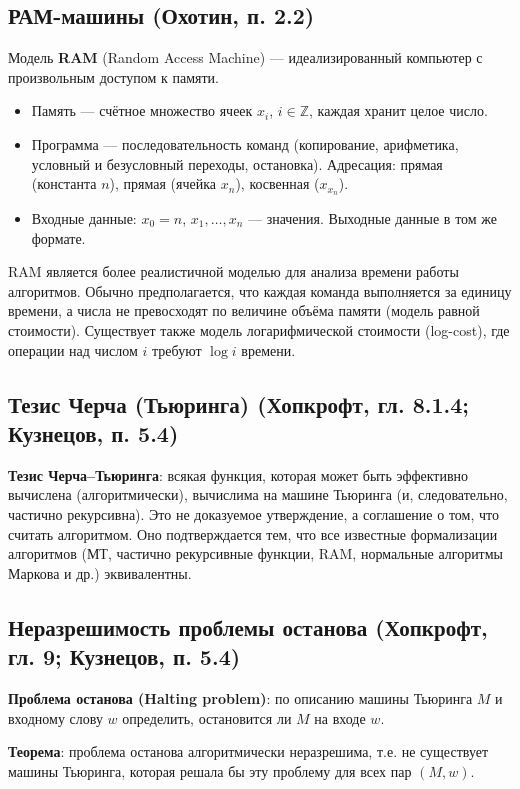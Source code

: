 \documentclass[a4paper,12pt]{article}
\begin{document}
\subsection{РАМ-машины (Охотин, п. 2.2)}
Модель \textbf{RAM} (Random Access Machine) --- идеализированный компьютер с произвольным доступом к памяти.
\begin{itemize}
    \item Память --- счётное множество ячеек \( x_i \), \( i\in\mathbb{Z} \), каждая хранит целое число.
    \item Программа --- последовательность команд (копирование, арифметика, условный и безусловный переходы, остановка). Адресация: прямая (константа \( n \)), прямая (ячейка \( x_n \)), косвенная (\( x_{x_n} \)).
    \item Входные данные: \( x_0 = n \), \( x_1,\dots,x_n \) --- значения. Выходные данные в том же формате.
\end{itemize}
RAM является более реалистичной моделью для анализа времени работы алгоритмов. Обычно предполагается, что каждая команда выполняется за единицу времени, а числа не превосходят по величине объёма памяти (модель равной стоимости). Существует также модель логарифмической стоимости (log-cost), где операции над числом \( i \) требуют \( \log i \) времени.

\subsection{Тезис Черча (Тьюринга) (Хопкрофт, гл. 8.1.4; Кузнецов, п. 5.4)}
\textbf{Тезис Черча--Тьюринга}: всякая функция, которая может быть эффективно вычислена (алгоритмически), вычислима на машине Тьюринга (и, следовательно, частично рекурсивна). Это не доказуемое утверждение, а соглашение о том, что считать алгоритмом. Оно подтверждается тем, что все известные формализации алгоритмов (МТ, частично рекурсивные функции, RAM, нормальные алгоритмы Маркова и др.) эквивалентны.

\subsection{Неразрешимость проблемы останова (Хопкрофт, гл. 9; Кузнецов, п. 5.4)}
\textbf{Проблема останова (Halting problem)}: по описанию машины Тьюринга \( M \) и входному слову \( w \) определить, остановится ли \( M \) на входе \( w \).

\textbf{Теорема}: проблема останова алгоритмически неразрешима, т.е. не существует машины Тьюринга, которая решала бы эту проблему для всех пар \( (M,w) \).
\end{document}
